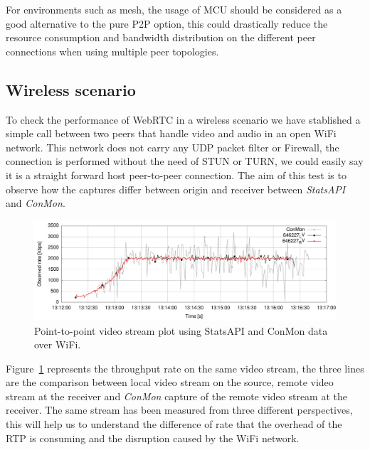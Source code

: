 For environments such as mesh, the usage of MCU should be considered as a good alternative to the pure P2P option, this could drastically reduce the resource consumption and bandwidth distribution on the different peer connections when using multiple peer topologies.

%

\subsection{Wireless scenario}

To check the performance of WebRTC in a wireless scenario we have stablished a simple call between two peers that handle video and audio in an open WiFi network. This network does not carry any UDP packet filter or Firewall, the connection is performed without the need of STUN or TURN, we could easily say it is a straight forward host peer-to-peer connection. The aim of this test is to observe how the captures differ between origin and receiver between {\it StatsAPI} and {\it ConMon}.

 \begin{figure}[h]
  \centering
    \includegraphics[width=1\textwidth]{./figures/onetoone_wifi_statsconmon.pdf}
      \caption[Point-to-point video stream plot using StatsAPI and ConMon data over WiFi]{Point-to-point video stream plot using StatsAPI and ConMon data over WiFi.}
	\label{fig:onetooneWifistatsconmon}
\end{figure}

Figure~\ref{fig:onetooneWifistatsconmon} represents the throughput rate on the same video stream, the three lines are the comparison between local video stream on the source, remote video stream at the receiver and {\it ConMon} capture of the remote video stream at the receiver. The same stream has been measured from three different perspectives, this will help us to understand the difference of rate that the overhead of the RTP is consuming and the disruption caused by the WiFi network.

